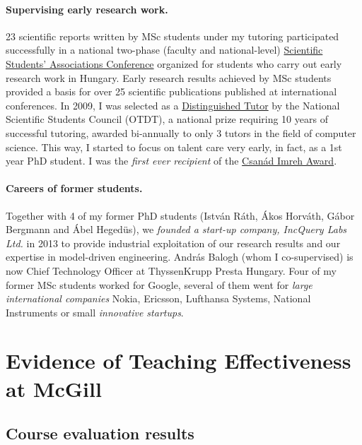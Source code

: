 \paragraph{Supervising early research work.} 
23 scientific reports written by MSc students under my tutoring participated successfully in a national two-phase (faculty and national-level) \href{http://www.otdt.hu/hu/cms/otdk/orszagos-tudomanyos-diakkori-konferencia/}{Scientific Students’ Associations Conference} organized for students who carry out early research work in Hungary. Early research results achieved by MSc students provided a basis for over 25 scientific publications published at international conferences. In 2009, I was selected as a \href{http://www.otdt.hu/page/kituntetesek/mak2009.php}{Distinguished Tutor} by the National Scientific Students Council (OTDT), a national prize requiring 10 years of successful tutoring, awarded bi-annually to only 3 tutors in the field of computer science. This way, I started to focus on talent care very early, in fact, as a 1st year PhD student. I was the \emph{first ever recipient} of the \href{https://otdk2017.mik.uni-pannon.hu/index.php/eredmenyek}{Csanád Imreh Award}.

\paragraph{Careers of former students.} Together with 4 of my former PhD students (István Ráth, Ákos Horváth, Gábor Bergmann and Ábel Hegedüs), we \emph{founded a start-up company, IncQuery Labs Ltd.} in 2013 to provide industrial exploitation of our research results and our expertise in model-driven engineering. András Balogh (whom I co-supervised) is now Chief Technology Officer at ThyssenKrupp Presta Hungary. Four of my former MSc students worked for Google, several of them went for \emph{large international companies} Nokia, Ericsson, Lufthansa Systems, National Instruments or small \emph{innovative startups}.


\section{Evidence of Teaching Effectiveness at McGill}
\label{sec:evid-teach-effect}

\subsection{Course evaluation results}
\label{sec:course-eval-results}

